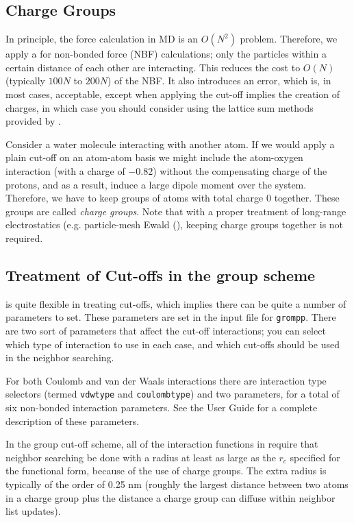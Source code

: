 \subsection{Charge Groups}
\label{sec:cg}
In principle, the force calculation in MD is an $O(N^2)$ problem.
Therefore, we apply a  for non-bonded force (NBF)
calculations; only the particles within a certain distance of each
other are interacting. This reduces the cost to $O(N)$ (typically
$100N$ to $200N$) of the NBF. It also introduces an error, which is,
in most cases, acceptable, except when applying the cut-off implies
the creation of charges, in which case you should consider using the
lattice sum methods provided by {\gromacs}.

Consider a water molecule interacting with another atom. If we would apply
a plain cut-off on an atom-atom basis we might include the atom-oxygen
interaction (with a charge of $-0.82$) without the compensating charge
of the protons, and as a result, induce a large dipole moment over the system.
Therefore, we have to keep groups of atoms with total charge
0 together. These groups are called {\em charge groups}. Note that with
a proper treatment of long-range electrostatics (e.g. particle-mesh Ewald
(), keeping charge groups together is not required.

\subsection{Treatment of Cut-offs in the group scheme}
\newcommand{\rs}{$r_{short}$}
\newcommand{\rl}{$r_{long}$}
{\gromacs} is quite flexible in treating cut-offs, which implies
there can be quite a number of parameters to set. These parameters are
set in the input file for {\tt grompp}. There are two sort of parameters
that affect the cut-off interactions; you can select which type
of interaction to use in each case, and which cut-offs should be
used in the neighbor searching.

For both Coulomb and van der Waals interactions there are interaction
type selectors (termed {\tt vdwtype} and {\tt coulombtype}) and two
parameters, for a total of six non-bonded interaction parameters. See
the User Guide for a complete description of these parameters.

In the group cut-off scheme, all of the interaction functions in 
require that neighbor searching be done with a radius at least as large as the $r_c$
specified for the functional form, because of the use of charge groups.
The extra radius is typically of the order of 0.25 nm (roughly the 
largest distance between two atoms in a charge group plus the distance a 
charge group can diffuse within neighbor list updates).

